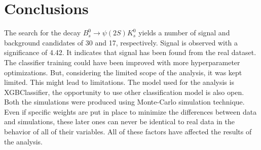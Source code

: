 \chapter{Conclusions}\label{ch:conclusion}
The search  for the decay $B_{s}^{0} \rightarrow \psi(2S)K_{s}^{0}$ yields a number of signal and background candidates of 30 and 17, respectively. Signal is observed with a significance of 4.42. It indicates that signal has been found from the real dataset. The classifier training could have been improved with more hyperparameter optimizations. But, considering the limited scope of the analysis, it was kept limited. This might lead to limitations. The model used for the analysis is XGBClassifier, the opportunity to use other classification model is also open.\\

Both the simulations were produced using Monte-Carlo simulation technique. Even if specific weights are put in place to minimize the differences between data and simulations, these later ones can never be identical to real data in the behavior of all of their variables. All of these factors have affected the results of the analysis.\\


